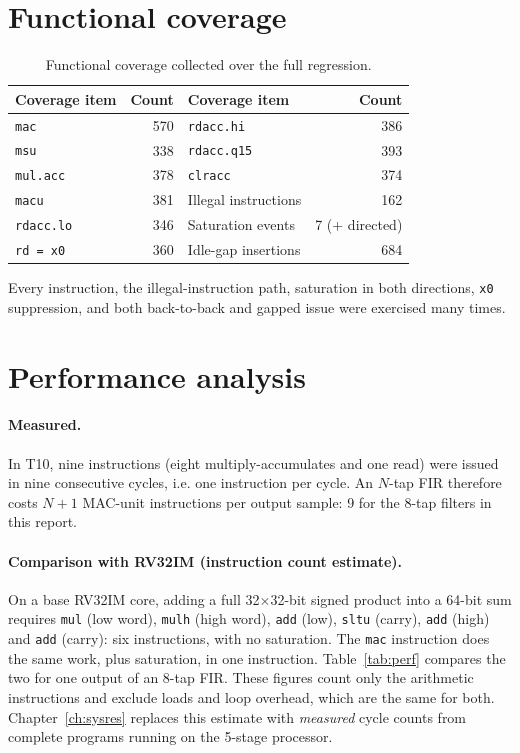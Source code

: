 \documentclass[11pt,a4paper]{report}
\newcommand{\code}[1]{\texttt{#1}}
\begin{document}
\section{Functional coverage}
\begin{table}[H]
  \centering
  \caption{Functional coverage collected over the full regression.}
  \label{tab:cov}
  \small
  \begin{tabular}{@{}lr@{\qquad}lr@{}}
    \toprule
    Coverage item & Count & Coverage item & Count \\
    \midrule
    \code{mac}       & 570 & \code{rdacc.hi}   & 386 \\
    \code{msu}       & 338 & \code{rdacc.q15}  & 393 \\
    \code{mul.acc}   & 378 & \code{clracc}     & 374 \\
    \code{macu}      & 381 & Illegal instructions & 162 \\
    \code{rdacc.lo}  & 346 & Saturation events & 7 (+ directed) \\
    \code{rd = x0}   & 360 & Idle-gap insertions & 684 \\
    \bottomrule
  \end{tabular}
\end{table}

Every instruction, the illegal-instruction path, saturation in both directions,
\code{x0} suppression, and both back-to-back and gapped issue were exercised
many times.

\section{Performance analysis}
\paragraph{Measured.}
In T10, nine instructions (eight multiply-accumulates and one read) were issued
in nine consecutive cycles, i.e. one instruction per cycle. An $N$-tap FIR
therefore costs $N+1$ MAC-unit instructions per output sample: 9 for the
8-tap filters in this report.

\paragraph{Comparison with RV32IM (instruction count estimate).}
On a base RV32IM core, adding a full 32$\times$32-bit signed product into a
64-bit sum requires \code{mul} (low word), \code{mulh} (high word), \code{add}
(low), \code{sltu} (carry), \code{add} (high) and \code{add} (carry): six
instructions, with no saturation. The \code{mac} instruction does the same
work, plus saturation, in one instruction. Table~\ref{tab:perf} compares the
two for one output of an 8-tap FIR. These figures count only the arithmetic
instructions and exclude loads and loop overhead, which are the same for both.
Chapter~\ref{ch:sysres} replaces this estimate with \emph{measured} cycle
counts from complete programs running on the 5-stage processor.
\end{document}
